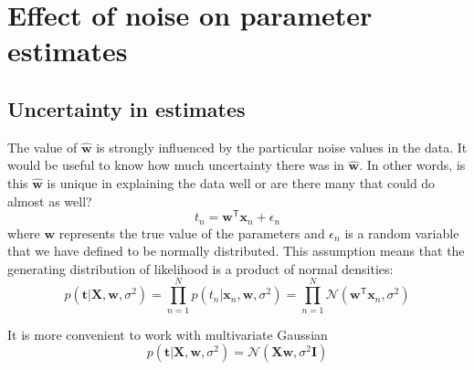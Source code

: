 \section{Effect of noise on parameter estimates}

\subsection{Uncertainty in estimates}

The value of $\widehat{\mathbf{w}}$ is strongly influenced by the particular noise values in the data.
It would be useful to know how much uncertainty there was in $\widehat{\mathbf{w}}$.
In other words, is this $\widehat{\mathbf{w}}$ is unique in explaining the data well or are there
many that could do almost as well?
\begin{equation}
t_{n} = \mathbf{w}^{\mathsf{T}}\mathbf{x}_{n} + \epsilon_{n}
\end{equation}
where $\mathbf{w}$ represents the true value of the parameters and $\epsilon_n$ is a random
variable that we have defined to be normally distributed. This assumption means that the
generating distribution of likelihood is a product of normal densities:
\begin{equation}
p(\mathbf{t}|\mathbf{X},\mathbf{w},\sigma^2) =
\prod_{n=1}^{N} p(t_{n} | \mathbf{x}_{n},\mathbf{w},\sigma^2) =
\prod_{n=1}^{N} \mathcal{N}(\mathbf{w}^{\mathsf{T}}\mathbf{x}_{n},\sigma^2)
\end{equation}

It is more convenient to work with multivariate Gaussian
\begin{equation}
p(\mathbf{t}|\mathbf{X},\mathbf{w},\sigma^2) = \mathcal{N}(\mathbf{X}\mathbf{w},\sigma^2\mathbf{I})
\end{equation}

